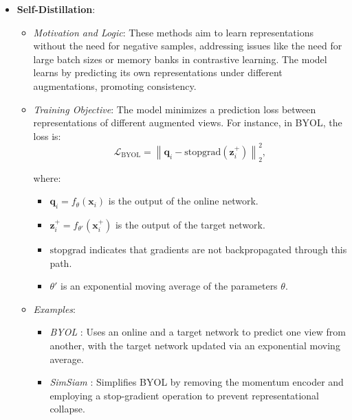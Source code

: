 \begin{itemize}
\begin{itemize}
\begin{itemize}
          \end{itemize}

    \end{itemize}
    \item \textbf{Self-Distillation}:
    \begin{itemize}
        \item \emph{Motivation and Logic}: These methods aim to learn representations without the need for negative samples, addressing issues like the need for large batch sizes or memory banks in contrastive learning. The model learns by predicting its own representations under different augmentations, promoting consistency.
        
        \item \emph{Training Objective}: The model minimizes a prediction loss between representations of different augmented views. For instance, in BYOL, the loss is:
                \[
        \mathcal{L}_{\text{BYOL}} = \left\| \mathbf{q}_i - \text{stopgrad}(\mathbf{z}_i^+) \right\|_2^2,
        \]

        where:
        \begin{itemize}
            \item \( \mathbf{q}_i = f_{\theta}(\mathbf{x}_i) \) is the output of the online network.
            \item \( \mathbf{z}_i^+ = f_{\theta'}(\mathbf{x}_i^+) \) is the output of the target network.
            \item \( \text{stopgrad} \) indicates that gradients are not backpropagated through this path.
            \item \( \theta' \) is an exponential moving average of the parameters \( \theta \).
        \end{itemize}
        
        \item \emph{Examples}:
        \begin{itemize}
            \item \emph{BYOL} \citep{grill2020bootstrap}: Uses an online and a target network to predict one view from another, with the target network updated via an exponential moving average.
            \item \emph{SimSiam} \citep{chen2021exploring}: Simplifies BYOL by removing the momentum encoder and employing a stop-gradient operation to prevent representational collapse.
        \end{itemize}
    \end{itemize}


\end{itemize}
